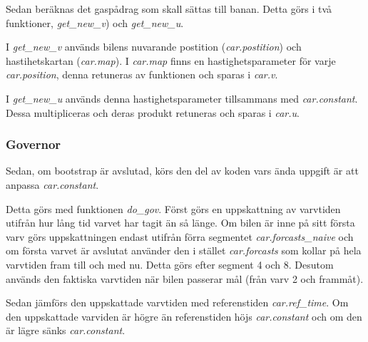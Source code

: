 Sedan beräknas det gaspådrag som skall sättas till banan. Detta görs i två
funktioner, \emph{get\_new\_v}) och \emph{get\_new\_u}.
 
I \emph{get\_new\_v} används bilens nuvarande postition (\emph{car.postition})
och hastihetskartan (\emph{car.map}). I \emph{car.map} finns en
hastighetsparameter för varje \emph{car.position}, denna retuneras av funktionen
och sparas i \emph{car.v}.
 
I \emph{get\_new\_u} används denna hastighetsparameter tillsammans med
\emph{car.constant}. Dessa multipliceras och deras produkt retuneras och sparas
i \emph{car.u}.

\subsubsection{Governor}

Sedan, om bootstrap är avslutad, körs den del av koden vars ända uppgift är att 
anpassa \emph{car.constant}. 

Detta görs med funktionen \emph{do\_gov}.  Först görs en uppskattning av varvtiden utifrån hur lång tid varvet har tagit än
så länge. Om bilen är inne på sitt första varv görs uppskattningen endast
utifrån förra segmentet \emph{car.forcasts\_naive} och om första varvet är
avslutat använder den i stället \emph{car.forcasts} som kollar på hela varvtiden
fram till och med nu. Detta görs efter segment 4 och 8. Desutom används den
faktiska varvtiden när bilen passerar mål (från varv 2 och frammåt).
 
Sedan jämförs den uppskattade varvtiden med referenstiden \emph{car.ref\_time}.
Om den uppskattade varviden är högre än referenstiden höjs \emph{car.constant}
och om den är lägre sänks \emph{car.constant}.
